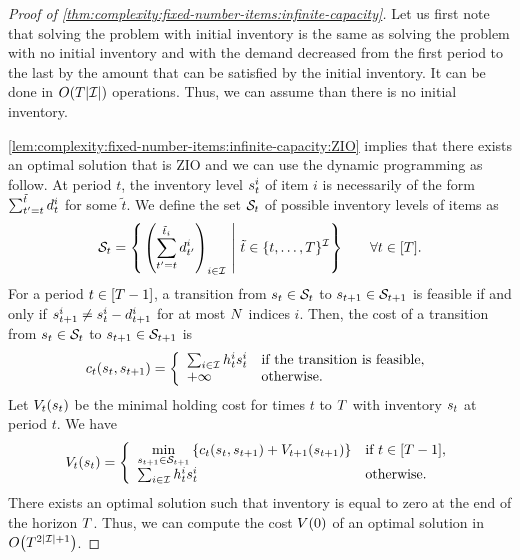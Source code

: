 \begin{proof}[Proof of \cref{thm:complexity:fixed-number-items:infinite-capacity}]
Let us first note that solving the problem with initial inventory is the same as solving the problem with no initial inventory and with the demand decreased from the first period to the last by the amount that can be satisfied by the initial inventory.
It can be done in $O\bracket{T\card{\REF}}$ operations.
Thus, we can assume than there is no initial inventory.


\cref{lem:complexity:fixed-number-items:infinite-capacity:ZIO} implies that there exists an optimal solution that is ZIO and we can use the dynamic programming as follow.
At period $t$, the inventory level $s_t^i$ of item $i$ is necessarily of the form $\sum_{t'=t}^{\tilde{t}}d_t^i$ for some $\tilde{t}$.
We define the set $\mathcal{S}_t$ of possible inventory levels of items as
\begin{equation}
\cS_t =
\left\{
\left.
\bracket{\sum_{t'=t}^{\tilde{t}_i}\demand_{t'}^i}_{i\in\REF}
\ \right| \ 
\tilde{t} \in \range[t]{\horizon}^{\REF}
\right\}\qquad\forall t\in\range{\horizon}.
\end{equation}
For a period $t\in\range{\horizon-1}$, a transition from $s_t\in\mathcal{S}_t$ to $s_{t+1}\in\mathcal{S}_{t+1}$ is feasible if and only if $s_{t+1}^i\ne s_t^i-d_{t+1}^i$ for at most $N$ indices $i$.
Then, the cost of a transition from $s_t\in\mathcal{S}_t$ to $s_{t+1}\in\mathcal{S}_{t+1}$ is
\begin{equation}
c_t\bracket{\inventory_t,\inventory_{t+1}} =
\left\{
\begin{array}{ll}
\sum_{i\in\REF}\holding_t^i\inventory_t^i & \mbox{if the transition is feasible},
\\
+\infty & \mbox{otherwise}.
\end{array}
\right.
\end{equation}
Let $V_t\bracket{\inventory_t}$ be the minimal holding cost for times $t$ to $T$ with inventory $s_t$ at period $t$.
We have
\begin{equation}
V_t\bracket{\inventory_t} =
\left\{
\begin{array}{ll}
\ds \min_{\inventory_{t+1}\in\cS_{t+1}} \crbracket{c_t\bracket{\inventory_t,\inventory_{t+1}} + V_{t+1}\bracket{\inventory_{t+1}}}
&
\mbox{if}\ t\in\range{\horizon-1},
\\
\sum_{i\in\REF}\holding_t^i\inventory_t^i
&
\mbox{otherwise}.
\end{array}
\right.
\end{equation}
There exists an optimal solution such that inventory is equal to zero at the end of the horizon $T$.
Thus, we can compute the cost $V\bracket{0}$ of an optimal solution in $O\bracket{\horizon^{2\card{\REF}+1}}$.
\end{proof}






